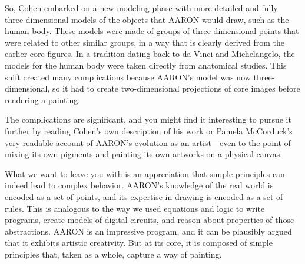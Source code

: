 So, Cohen embarked on a new modeling phase with more detailed and fully
three-dimensional models of the objects that AARON would draw, such as the human
body. These models were made of groups of three-dimensional points that were
related to other similar groups, in a way that is clearly derived from the earlier
core figures. In a tradition dating back to da Vinci and Michelangelo, the models
for the human body were taken directly from anatomical studies. This shift
created many complications because AARON's model was now three-dimensional,
so it had to create two-dimensional projections of core images before rendering a
painting.

The complications are significant, and you might find it interesting to pursue
it further by reading Cohen's own description
of his work or Pamela McCorduck's
very readable account of AARON's evolution as an
artist---even to the point of mixing its own pigments and painting its own artworks
on a physical canvas.

What we want to leave you with is an appreciation that
simple principles can indeed lead to complex behavior.
AARON's knowledge of the real world is encoded as a set of points,
and its expertise in drawing is encoded as a set of rules.
This is analogous to the way we used equations and logic to write programs,
create models of digital circuits, and reason about properties of those abstractions.
AARON is an impressive program, and it can be plausibly argued that it exhibits
artistic creativity. But at its core, it is
composed of simple principles that, taken as a whole, capture a way of painting.

